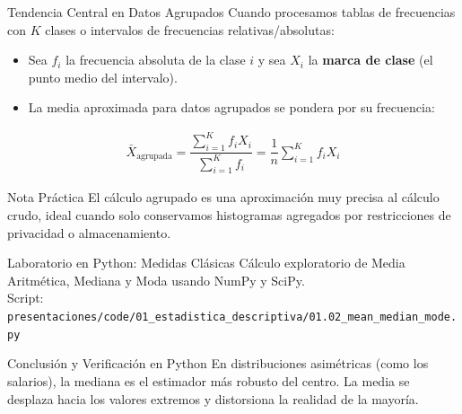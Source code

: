 \documentclass[10pt,aspectratio=169]{beamer}
\begin{document}
\begin{frame}{Tendencia Central en Datos Agrupados}
  Cuando procesamos tablas de frecuencias con $K$ clases o intervalos de frecuencias relativas/absolutas: \pause
  \begin{itemize}
    \item Sea $f_i$ la frecuencia absoluta de la clase $i$ y sea $X_i$ la \textbf{marca de clase} (el punto medio del intervalo). \pause
    \item La media aproximada para datos agrupados se pondera por su frecuencia:
  \end{itemize}
  \begin{align}
    \bar{X}_{\text{agrupada}} = \dfrac{\sum_{i=1}^{K} f_i X_i}{\sum_{i=1}^{K} f_i} = \dfrac{1}{n} \sum_{i=1}^{K} f_i X_i
  \end{align}
  \pause
  \begin{alertblock}{Nota Práctica}
    El cálculo agrupado es una aproximación muy precisa al cálculo crudo, ideal cuando solo conservamos histogramas agregados por restricciones de privacidad o almacenamiento.
  \end{alertblock}
\end{frame}

\begin{frame}{Laboratorio en Python: Medidas Clásicas}
  Cálculo exploratorio de Media Aritmética, Mediana y Moda usando NumPy y SciPy.
  \\ Script: \texttt{\footnotesize presentaciones/code/01\_estadistica\_descriptiva/01.02\_mean\_median\_mode.py}
  
  \vspace{0.4em}
  {\lstset{basicstyle=\ttfamily\tiny, aboveskip=0.2em, belowskip=0.2em}
  
  }

  \vspace{0.2em}
  \begin{alertblock}{Conclusión y Verificación en Python}
    En distribuciones asimétricas (como los salarios), la mediana es el estimador más robusto del centro. La media se desplaza hacia los valores extremos y distorsiona la realidad de la mayoría.
  \end{alertblock}
\end{frame}
\end{document}
